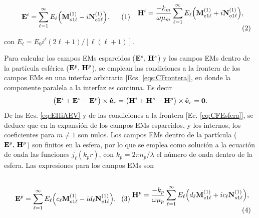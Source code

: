 	\begin{subequations}
	\eqhalf{	\vb{E}^i = \sum_{\ell =1}^\infty  E_\ell\qty(\vb{M}_{o1\ell}^{(1)}-i\vb{N}_{e1\ell}^{(1)}).\label{eqs:EiAEV}}
	\eqhalf{\vb{H}^i =\frac{-k_m}{\omega\mu_m} \sum_{\ell =1}^\infty  E_\ell\qty(\vb{M}_{e1\ell}^{(1)}+i\vb{N}_{o1\ell}^{(1)}),	\label{eqs:HiAEV}}
	\label{eq:EHiAEV}		
	\end{subequations}
\noindent con $E_\ell = E_0 i^\ell (2\ell+1)/[\ell(\ell+1)]$.

Para calcular los campos EMs esparcidos ($\vb{E}^s,\,\vb{H}^s$) y los campos EMs dentro de la partícula esférica ($\vb{E}^p,\,\vb{H}^p$), se emplean las condiciones a la frontera de los campos EMs en una interfaz arbitraria [Ecs. \eqref{eqs:CFrontera}], en donde la componente paralela a la interfaz es continua. Es decir
	\begin{align}
	\qty(\vb{E}^i+\vb{E}^s -\vb{E}^p)\times\vu{e}_r =
	\qty(\vb{H}^i+\vb{H}^s -\vb{H}^p)\times\vu{e}_r = \vb{0}.
	\label{eq:CFEsfera}
	\end{align}
De las Ecs. \eqref{eq:EHiAEV} y de las condiciones a la frontera [Ec. \eqref{eq:CFEsfera}], se deduce que en la expansión de los campos EMs esparcidos, y los internos, los coeficientes para $m\neq 1$ son nulos. Los campos EMs dentro de la partícula ($\vb{E}^p,\,\vb{H}^p$) son finitos en la esfera, por lo que se emplea como solución a la ecuación de onda las funciones $j_\ell(k_p r)$, con $k_p = 2\pi n_p /\lambda$ el número de onda dentro de la esfera. Las expresiones para los campos EMs son
	
	\begin{subequations}
	\eqhalf{\vb{E}^p = \sum_{\ell =1}^\infty E_\ell \qty(c_\ell \vb{M}_{o1\ell}^{(1)}-i d_\ell\vb{N}_{e1\ell}^{(1)}),	\label{eqs:EpAEV}}
	\eqhalf{\vb{H}^p = \frac{-k_p}{\omega\mu_p} \sum_{\ell =1}^\infty E_\ell\qty(d_\ell\vb{M}_{e1\ell}^{(1)}+i c_\ell\vb{N}_{o1\ell}^{(1)}),\label{eqs:HpAEV}}
	\label{eq:EHpAEV}		
	\end{subequations}

